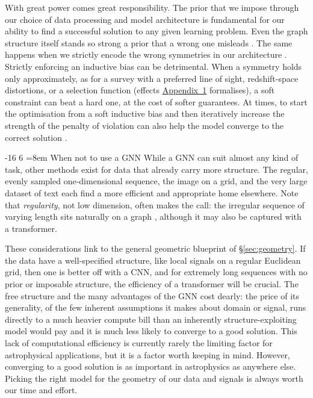 \documentclass[graybox, envcountchap]{Template/svmult}
\makeatletter
\renewcommand\subsubsection{\@startsection{subsubsection}{3}{\z@}%
                       {-16\p@}%
                       {6\p@}%
                       {\normalfont\normalsize\subsubsecstyle
                        \rightskip=\z@ \@plus 8em\pretolerance=10000 }}
\makeatother
\begin{document}
With great power comes great responsibility. The prior that we impose through our choice of data processing and model architecture is fundamental for our ability to find a successful solution to any given learning problem. Even the graph structure itself stands so strong a prior that a wrong one misleads \citep{BechlerSpeicher2024_graph_overuse}. The same happens when we strictly encode the wrong symmetries in our architecture \citep{Finzi2021_RPP_softequivariance}. Strictly enforcing an inductive bias can be detrimental. When a symmetry holds only approximately, as for a survey with a preferred line of sight, redshift-space distortions, or a selection function (effects \hyperref[app:sym:deformation]{Appendix~1} formalises), a soft constraint can beat a hard one, at the cost of softer guarantees. At times, to start the optimisation from a soft inductive bias and then iteratively increase the strength of the penalty of violation can also help the model converge to the correct solution \citep{wilson2025deeplearningmysteriousdifferent}.

\subsubsection{When not to use a GNN}
\label{subsec:bp-when-not}
While a GNN can suit almost any kind of task, other methods exist for data that already carry more structure. The regular, evenly sampled one-dimensional sequence, the image on a grid, and the very large dataset of text each find a more efficient and appropriate home elsewhere. Note that \emph{regularity}, not low dimension, often makes the call: the irregular sequence of varying length sits naturally on a graph \citep{Iqbal2025_cluster_xray_GNN}, although it may also be captured with a transformer. 

These considerations link to the general geometric blueprint of \S\ref{sec:geometry}. If the data have a well-specified structure, like local signals on a regular Euclidean grid, then one is better off with a CNN, and for extremely long sequences with no prior or imposable structure, the efficiency of a transformer will be crucial. The free structure and the many advantages of the GNN cost dearly: the price of its generality, of the few inherent assumptions it makes about domain or signal, runs directly to a much heavier compute bill than an inherently structure-exploiting model would pay and it is much less likely to converge to a good solution. This lack of computational efficiency is currently rarely the limiting factor for astrophysical applications, but it is a factor worth keeping in mind. However, converging to a good solution is as important in astrophysics as anywhere else. Picking the right model for the geometry of our data and signals is always worth our time and effort.
\end{document}
